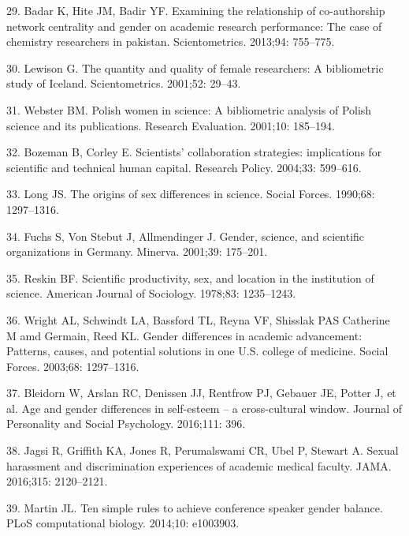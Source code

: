 \documentclass[12pt,]{article}
\begin{document}
\leavevmode\hypertarget{ref-Badar_2013}{}%
29. Badar K, Hite JM, Badir YF. Examining the relationship of
co-authorship network centrality and gender on academic research
performance: The case of chemistry researchers in pakistan.
Scientometrics. 2013;94: 755--775.

\leavevmode\hypertarget{ref-Lewison_2001}{}%
30. Lewison G. The quantity and quality of female researchers: A
bibliometric study of Iceland. Scientometrics. 2001;52: 29--43.

\leavevmode\hypertarget{ref-Webster_2001}{}%
31. Webster BM. Polish women in science: A bibliometric analysis of
Polish science and its publications. Research Evaluation. 2001;10:
185--194.

\leavevmode\hypertarget{ref-Bozeman_2004}{}%
32. Bozeman B, Corley E. Scientists' collaboration strategies:
implications for scientific and technical human capital. Research
Policy. 2004;33: 599--616.

\leavevmode\hypertarget{ref-Long_1990}{}%
33. Long JS. The origins of sex differences in science. Social Forces.
1990;68: 1297--1316.

\leavevmode\hypertarget{ref-Fuchs_2001}{}%
34. Fuchs S, Von Stebut J, Allmendinger J. Gender, science, and
scientific organizations in Germany. Minerva. 2001;39: 175--201.

\leavevmode\hypertarget{ref-Reskin_1978}{}%
35. Reskin BF. Scientific productivity, sex, and location in the
institution of science. American Journal of Sociology. 1978;83:
1235--1243.

\leavevmode\hypertarget{ref-Wright_2003}{}%
36. Wright AL, Schwindt LA, Bassford TL, Reyna VF, Shisslak PAS
Catherine M amd Germain, Reed KL. Gender differences in academic
advancement: Patterns, causes, and potential solutions in one U.S.
college of medicine. Social Forces. 2003;68: 1297--1316.

\leavevmode\hypertarget{ref-bleidorn2016age}{}%
37. Bleidorn W, Arslan RC, Denissen JJ, Rentfrow PJ, Gebauer JE, Potter
J, et al. Age and gender differences in self-esteem -- a cross-cultural
window. Journal of Personality and Social Psychology. 2016;111: 396.

\leavevmode\hypertarget{ref-jagsi_2016}{}%
38. Jagsi R, Griffith KA, Jones R, Perumalswami CR, Ubel P, Stewart A.
Sexual harassment and discrimination experiences of academic medical
faculty. JAMA. 2016;315: 2120--2121.

\leavevmode\hypertarget{ref-Martin_2014}{}%
39. Martin JL. Ten simple rules to achieve conference speaker gender
balance. PLoS computational biology. 2014;10: e1003903.
\end{document}
